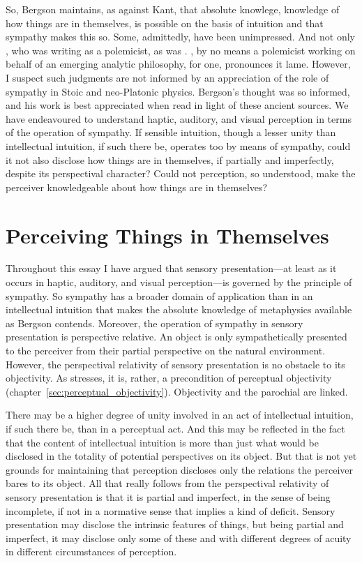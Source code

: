 So, Bergson maintains, as against Kant, that absolute knowlege, knowledge of how things are in themselves, is possible on the basis of intuition and that sympathy makes this so. Some, admittedly, have been unimpressed. And not only \citet{Russell:1912rt}, who was writing as a polemicist, as was \citet{Stebbing:1914kx}. \citet[202]{Jay:1994aa}, by no means a polemicist working on behalf of an emerging analytic philosophy, for one, pronounces it lame. However, I suspect such judgments are not informed by an appreciation of the role of sympathy in Stoic and neo-Platonic physics. Bergson's thought was so informed, and his work is best appreciated when read in light of these ancient sources. We have endeavoured to understand haptic, auditory, and visual perception in terms of the operation of sympathy. If sensible intuition, though a lesser unity than intellectual intuition, if such there be, operates too by means of sympathy, could it not also disclose how things are in themselves, if partially and imperfectly, despite its perspectival character? Could not perception, so understood, make the perceiver knowledgeable about how things are in themselves?


\section{Perceiving Things in Themselves} %
\label{sec:perceiving_things_in_themselves}

Throughout this essay I have argued that sensory presentation---at least as it occurs in haptic, auditory, and visual perception---is governed by the principle of sympathy. So sympathy has a broader domain of application than in an intellectual intuition that makes the absolute knowledge of metaphysics available as Bergson contends. Moreover, the operation of sympathy in sensory presentation is perspective relative. An object is only sympathetically presented to the perceiver from their partial perspective on the natural environment. However, the perspectival relativity of sensory presentation is no obstacle to its objectivity. As \citet{Merleau-Ponty:1967fj} stresses, it is, rather, a precondition of perceptual objectivity (chapter~\ref{sec:perceptual_objectivity}). Objectivity and the parochial are linked. 


There may be a higher degree of unity involved in an act of intellectual intuition, if such there be, than in a perceptual act. And this may be reflected in the fact that the content of intellectual intuition is more than just what would be disclosed in the totality of potential perspectives on its object. But that is not yet grounds for maintaining that perception discloses only the relations the perceiver bares to its object. All that really follows from the perspectival relativity of sensory presentation is that it is partial and imperfect, in the sense of being incomplete, if not in a normative sense that implies a kind of deficit. Sensory presentation may disclose the intrinsic features of things, but being partial and imperfect, it may disclose only some of these and with different degrees of acuity in different circumstances of perception.

